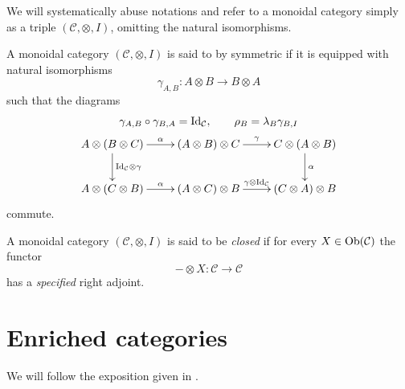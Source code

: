 \begin{rmk}
We will systematically abuse notations and refer to a monoidal category simply as a triple $(\mathcal C, \otimes, I)$, omitting the natural isomorphisms.
\end{rmk}

\begin{defin}
A monoidal category $(\mathcal C, \otimes, I)$ is said to by symmetric if it is equipped with natural isomorphisms
\[
\gamma_{A,B} \colon A \otimes B \to B \otimes A
\]
such that the diagrams
\begin{gather*}
\gamma_{A,B} \circ \gamma_{B,A} = \mathrm{Id}_{\mathcal C}, \qquad \rho_B = \lambda_B \gamma_{B,I} \\
\xymatrix{
A \otimes (B \otimes C) \ar[r]^-\alpha \ar[d]^{\mathrm{Id}_{\mathcal C} \otimes \gamma} & (A \otimes B) \otimes C \ar[r]^\gamma & C \otimes (A \otimes B) \ar[d]^\alpha \\ A \otimes (C \otimes B) \ar[r]^\alpha & (A \otimes C) \otimes B \ar[r]^{\gamma \otimes \mathrm{Id}_{\mathcal C}} & (C \otimes A) \otimes B
}
\end{gather*}
commute.
\end{defin}

\begin{defin}
A monoidal category $(\mathcal C, \otimes, I)$ is said to be \emph{closed} if for every $X \in \mathrm{Ob}(\mathcal C)$ the functor
\[
- \otimes X \colon \mathcal C \to \mathcal C
\]
has a \emph{specified} right adjoint.
\end{defin}

\section{Enriched categories}

We will follow the exposition given in \cite{kelly}.

